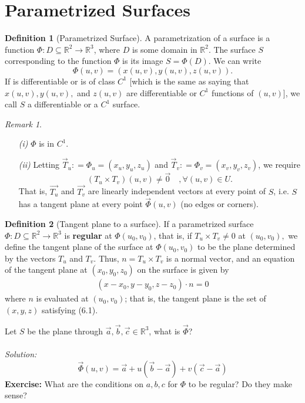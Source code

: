 \documentclass[12pt]{book}
\theoremstyle{definition}
\newtheorem{definition}{Definition}[section]
\theoremstyle{remark}
\newtheorem*{remark}{Remark}
\newcommand\sol{%
  \\ 
  \\
  \textit{Solution:}\\%
}
\begin{document}
  \section{Parametrized Surfaces}%
    \label{sec:Parametrized Surfaces}
    \begin{definition}[Parametrized Surface]
      A parametrization of a surface is a function $\Phi: D \subseteq \mathbb{R}^2 \to \mathbb{R}^3$, where $D$ is some domain in $\mathbb{R}^2$. The surface $S$ corresponding to the function $\Phi$ is its image $ S= \Phi(D)$. We can write
$$\Phi(u, v) = (x(u, v), y(u, v), z(u, v)).$$
If is differentiable or is of class $C^1$ [which is the same as saying that $x(u, v), y(u, v),$ and $z(u, v)$ are differentiable or $C^1$  functions of $(u, v)$], we call $S$ a differentiable or a $C^1$ surface.
    \end{definition}
\begin{remark}$  $ 
  \begin{enumerate}
    \item[\it (i)] $\Phi$ is in $C^1$. 
    \item[\it (ii)] Letting $\vec{{T}} _u : = \Phi_u = (x_u, y_u , z_u)$ and $\vec{{T}} _v : = \Phi_v = (x_v, y_v , z_v)$, we require 
    $$(T_u \times T_v)(u,v) \neq \vec{{0}} \quad, \forall (u,v) \in U. $$
    That is, $\vec{T_u}$ and $\vec{T_v}$ are linearly independent vectors at every point of $S$, i.e. $S$ has a tangent plane at every point $\vec{\Phi} (u,v)$ (no edges or corners).  
  \end{enumerate}
\end{remark}
\begin{definition}[Tangent plane to a surface]
  If a parametrized surface $\Phi : D \subseteq \mathbb{R}^2 \to \mathbb{R}^3$ is \textbf{regular} at $\Phi(u_0, v_0)$, that is, if $T_u \times T_v \neq 0$ at $(u_0, v_0), $ we define the tangent plane of the surface at $\Phi(u_0, v_0)$ to be the plane determined by the vectors $T_u$ and $T_v$. Thus, $n = T_u \times T_v$ is a normal vector, and an equation of the tangent plane at $(x_0, y_0, z_0)$ on the surface is given by
\begin{equation}
  \begin{split}
  (x - x_0, y - y_0, z - z_0) \cdot {} n = 0
  \end{split}
\end{equation}
  where $n$ is evaluated at $(u_0, v_0)$; that is, the tangent plane is the set of $(x, y, z)$  satisfying (6.1).   
\end{definition}
   \begin{example}Let $S$ be the plane through $\vec{{a}} , \vec{{b}} , \vec{{c}} \in \mathbb{R}^3$, what is $\vec{{\Phi}}$?
     \sol 
     $$\vec{{\Phi}} (u,v) = \vec{{a}} + u (\vec{{b}} - \vec{{a}} {})+ v (\vec{{c}} - \vec{{a}} ) $$
\textbf{Exercise: }What are the conditions on $a,b,c$ for $\Phi$ to be regular? Do they make sense?    
   \end{example} 
\end{document}
